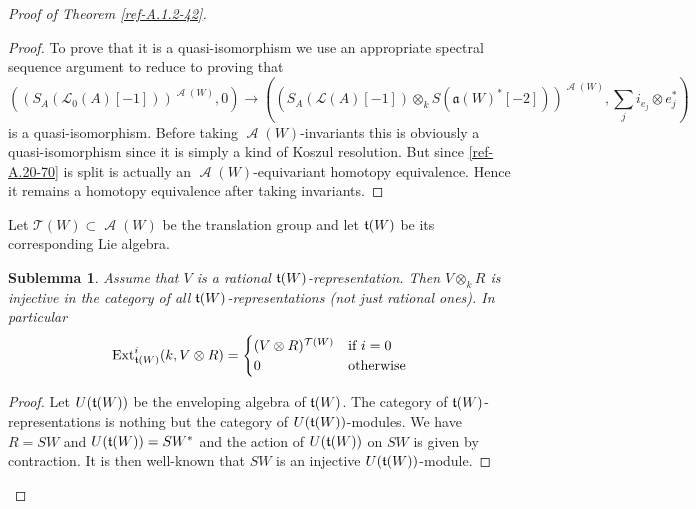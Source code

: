\documentclass{amsart}
\numberwithin{equation}{section}
\let\cal\mathcal
\newtheorem*{sublemma}{Sublemma}
\theoremstyle{definition}
\theoremstyle{remark}
\begin{document}
\begin{proof}[Proof of Theorem \ref{ref-A.1.2-42}]
\begin{proof}
To prove that it is a quasi-isomorphism we use an appropriate spectral
sequence argument to reduce to proving that 
\[
((S_A({{\cal L}}_0(A)[-1]))^{{\operatorname{{\cal A}}}(W)},0)\rightarrow ((S_A({{\cal L}}(A)[-1])\otimes_k S({\mathfrak{a}}(W)^\ast[-2]))^{{\operatorname{{\cal A}}}(W)},\sum_j i_{e_j}\otimes e_j^\ast)
\]
is a quasi-isomorphism. Before taking ${\operatorname{{\cal A}}}(W)$-invariants this is
obviously a quasi-isomorphism since it is simply a kind of Koszul
resolution. But since \eqref{ref-A.20-70} is split is actually an
${\operatorname{{\cal A}}}(W)$-equivariant homotopy equivalence. Hence it remains a
homotopy equivalence after taking invariants.
\end{proof}
Let ${{\cal T}}(W)\subset {\operatorname{{\cal A}}}(W)$ be the translation group and let $\frak{t}(W)$ be
its corresponding Lie algebra. 
\begin{sublemma} Assume that $V$ is a rational $\frak{t}(W)$-representation. Then
$V\otimes_k R$ is injective in the category of all $\frak{t}(W)$-representations
(not just rational ones). In particular
\[
{\operatorname {Ext}}^i_{\frak{t}(W)}(k,V\otimes R)=
\begin{cases}
(V\otimes R)^{{{\cal T}}(W)}&\text{if $i=0$}\\
0&\text{otherwise}
\end{cases}
\]
\end{sublemma}
\begin{proof} Let $U(\frak{t}(W))$ be the enveloping algebra of
  $\frak{t}(W)$. The category of $\frak{t}(W)$-representations is nothing
  but the category of $U(\frak{t}(W))$-modules. We have $R=SW$ and $U(\frak{t}(W))=SW^\ast$ and the action of $U(\frak{t}(W))$ on $SW$ is given by contraction. It
is then well-known that $SW$ is an injective $U(\frak{t}(W))$-module. 


\end{proof}
\end{proof}
\end{document}
